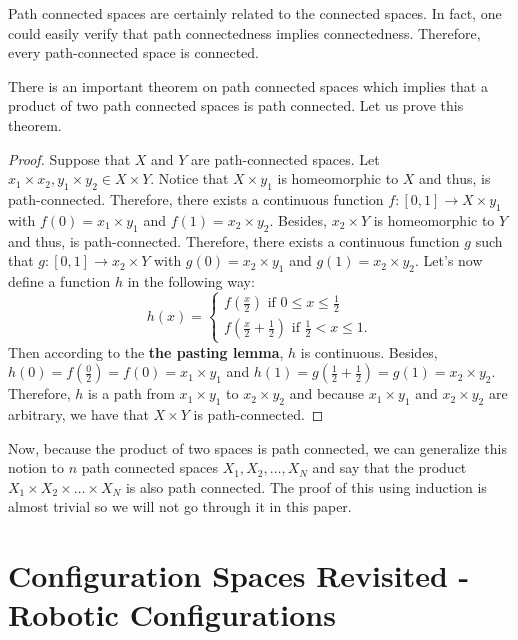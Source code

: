 \documentclass[12pt]{article}
\theoremstyle{definition}
\begin{document}
Path connected spaces are certainly related to the connected spaces.
\cite{10} In fact, one could easily verify that path connectedness implies connectedness.
Therefore, every path-connected space is connected.

\bigskip

There is an important theorem on path connected spaces which implies that a product of two path connected spaces is path connected.
Let us prove this theorem.

\begin{proof}
Suppose that $X$ and $Y$ are path-connected spaces.
Let $x_1 \times x_2, y_1 \times y_2 \in X \times Y$.
Notice that $X \times y_1$ is homeomorphic to $X$
and thus, is path-connected. Therefore, there exists
a continuous function $f : [0, 1] \to X \times y_1$
with $f(0) = x_1 \times y_1$ and $f(1) = x_2 \times y_2$.
Besides, $x_2 \times Y$ is homeomorphic to $Y$ and thus,
is path-connected. Therefore, there exists a continuous
function $g$ such that $g : [0, 1] \to x_2 \times Y$
with $g(0) = x_2 \times y_1$ and $g(1) = x_2 \times y_2$.
Let's now define a function $h$ in the following way:
$$
h(x) = 
\begin{cases}
f(\frac{x}{2}) \mbox{ if } 0 \leq x \leq \frac{1}{2}\\
f(\frac{x}{2} + \frac{1}{2}) \mbox{ if } \frac{1}{2} < x \leq 1.
\end{cases}
$$
Then according to the \cite{11} \textbf{the pasting lemma},
$h$ is continuous. Besides, $h(0) = f(\frac{0}{2}) = f(0) = x_1 \times y_1$
and $h(1) = g(\frac{1}{2} + \frac{1}{2}) = g(1) = x_2 \times y_2$.
Therefore, $h$ is a path from $x_1 \times y_1$ to $x_2 \times y_2$
and because $x_1 \times y_1$ and $x_2 \times y_2$ are arbitrary, we have that
$X \times Y$ is path-connected.
\end{proof}

Now, because the product of two spaces is path connected, we can generalize this
notion to $n$ path connected spaces $X_1, X_2, \dots, X_N$ and say that the product
$X_1 \times X_2 \times \dots \times X_N$ is also path connected. The proof of this
using induction is almost trivial so we will not go through it in this paper.


\section*{\centering Configuration Spaces Revisited - Robotic Configurations}
\end{document}
